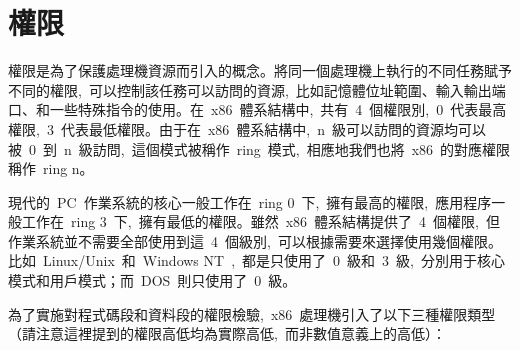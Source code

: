 \section{權限}


權限是為了保護處理機資源而引入的概念。將同一個處理機上執行的不同任務賦予不同的權限,~可以控制該任務可以訪問的資源,~比如記憶體位址範圍、輸入輸出端口、和一些特殊指令的使用。在~x86~體系結構中,~共有~4~個權限別,~0~代表最高權限,~3~代表最低權限。由于在~x86~體系結構中,~n~級可以訪問的資源均可以被~0~到~n~級訪問,~這個模式被稱作~ring~模式,~相應地我們也將~x86~的對應權限稱作~ring n。

現代的~PC~作業系統的核心一般工作在~ring 0~下,~擁有最高的權限,~應用程序一般工作在~ring 3~下,~擁有最低的權限。雖然~x86~體系結構提供了~4~個權限,~但作業系統並不需要全部使用到這~4~個級別,~可以根據需要來選擇使用幾個權限。比如~Linux/Unix~和~Windows NT~,~都是只使用了~0~級和~3~級,~分別用于核心模式和用戶模式；而~DOS~則只使用了~0~級。

為了實施對程式碼段和資料段的權限檢驗,~x86~處理機引入了以下三種權限類型（請注意這裡提到的權限高低均為實際高低,~而非數值意義上的高低）：

